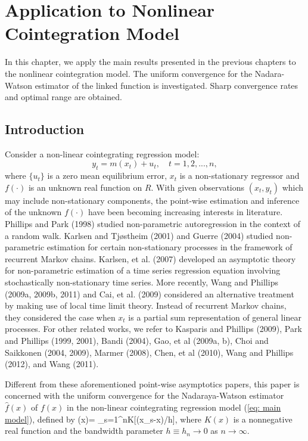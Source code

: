 \chapter{Application to Nonlinear Cointegration Model}
\ifpdf
    \graphicspath{{Chapter3/Chapter3Figs/PNG/}{Chapter3/Chapter3Figs/PDF/}{Chapter3/Chapter3Figs/}}
\else
    \graphicspath{{Chapter3/Chapter3Figs/EPS/}{Chapter3/Chapter3Figs/}}
\fi

In this chapter, we apply the main results presented in the previous chapters to the nonlinear cointegration model. The uniform convergence for the Nadara-Watson estimator of the linked function is investigated. Sharp convergence rates and optimal range are obtained.

\section{Introduction}

Consider a non-linear cointegrating regression model:
\begin{equation}
y_{t}=m(x_{t})+u_{t},\quad t=1,2,...,n,  \label{mo1}
\end{equation}%
where $\{u_{t}\}$ is a  zero mean  equilibrium error, $x_{t}$ is a
non-stationary  regressor and  $f(\cdot)$ is an unknown  real function on $R$. With given observations $(x_t, y_t)$ which may include
non-stationary components, the point-wise estimation  and
inference of the unknown $f(\cdot)$ have been becoming increasing
interests in literature. Phillips and Park (1998)
studied non-parametric autoregression in the context of a random
walk. Karlsen and Tj\o stheim (2001) and Guerre (2004) studied
non-parametric estimation for certain non-stationary processes in the
framework of recurrent Markov chains. Karlsen, et al. (2007)
developed an asymptotic theory for non-parametric estimation of a
time series regression equation involving stochastically
non-stationary time series. More recently,  Wang and Phillips (2009a, 2009b, 2011) and Cai, et al. (2009) considered an alternative treatment by making use of local
time limit theory. Instead of recurrent Markov chains, they considered the case when
$x_t$ is a partial sum representation of general linear processes.
 For other related works, we refer to Kasparis and Phillips (2009),
 Park and  Phillips (1999, 2001), Bandi (2004), Gao, et al (2009a, b),
  Choi and Saikkonen (2004, 2009),  Marmer (2008), Chen, et al (2010),  Wang and Phillips (2012), and  Wang (2011).

Different from these aforementioned point-wise asymptotics papers, this paper is concerned with the uniform convergence for the Nadaraya-Watson estimator $\hat{f}(x)$ of $f(x)$ in the non-linear cointegrating
regression model (\ref {eq: main model}), defined by
\be {}(x)=
{\sum_{s=1}^{n}K[(x_{s}-x)/h]},
\ee
where $K(x)$ is a nonnegative real function and  the bandwidth parameter $h\equiv h_n\to 0$ as $n\to\infty$.

